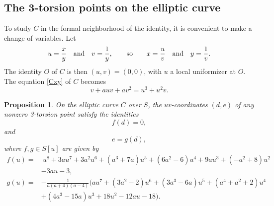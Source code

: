 \documentclass{gtpart}
\newtheorem{prop}[thm]{Proposition}
\theoremstyle{definition}
\theoremstyle{remark}
\newcommand{\ad}{{\rm and}}
\begin{document}
\subsection{The 3-torsion points on the elliptic curve}

To study $C$ in the formal neighborhood of the identity, it is convenient to make a change of variables.  
Let 
\[
 u = \frac{x}{y} \quad \ad \quad v = \frac{1}{y}, \qquad {\rm so} \qquad x = \frac{u}{v} \quad \ad \quad y = \frac{1}{v}.  
\]
The identity $O$ of $C$ is then $(u,v) = (0,0)$, with $u$ a local uniformizer at $O$.  
The equation \eqref{Cxy} of $C$ becomes 
\begin{equation}
\label{Cuv}
 v + a u v + a v^2 = u^3 + u^2 v.  
\end{equation}

\begin{prop}
\label{prop:tors}
 On the elliptic curve $C$ over $S$, the $uv$-coordinates $(d,e)$ of any nonzero 3-torsion point satisfy the identities 
 \begin{equation}
 \label{f}
  f(d) = 0, 
 \end{equation}
 and 
 \begin{equation}
 \label{g}
  e = g(d), 
 \end{equation}
 where $f, g \in S[u]$ are given by 
 \begin{equation*}
 \begin{split}
  f(u) = & ~ u^8 + 3 a u^7 + 3 a^2 u^6 + (a^3 + 7 a) u^5 + (6 a^2 - 6) u^4 + 9 a u^3 + (-a^2 + 8) u^2 \\
         & - 3 a u - 3, \\
  g(u) = & -\frac{1}{a (a + 4) (a - 4)} \big(a u^7 + (3 a^2 - 2) u^6 + (3 a^3 - 6 a) u^5 + (a^4 + a^2 + 2) u^4 \\
         & + (4 a^3 - 15 a) u^3 + 18 u^2 - 12 a u - 18\big).  
 \end{split}
 \end{equation*}
\end{prop}
\end{document}
